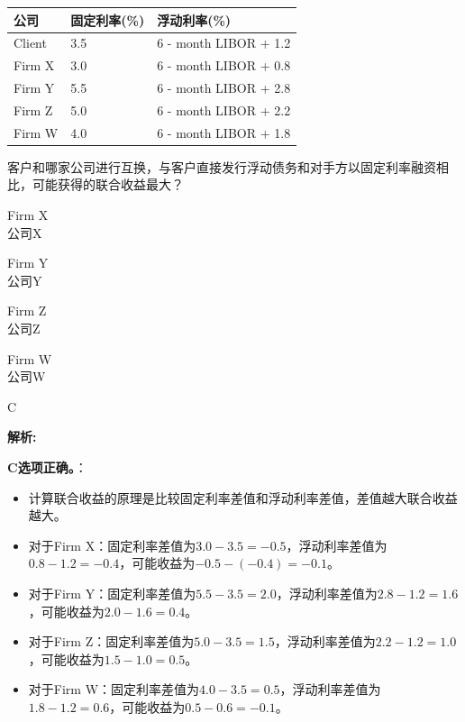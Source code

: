 \documentclass{article}
\newcounter{question} %
\newenvironment{explanation}
{\textbf{解析:}\par}
{\par}
\begin{document}
\begin{question}
\begin{center}
    \begin{tabular}{|l|l|l|}
    \hline
    公司 & 固定利率(\%) & 浮动利率(\%) \\
    \hline
    Client & 3.5 & 6 - month LIBOR + 1.2 \\
    \hline
    Firm X & 3.0 & 6 - month LIBOR + 0.8 \\
    \hline
    Firm Y & 5.5 & 6 - month LIBOR + 2.8 \\
    \hline
    Firm Z & 5.0 & 6 - month LIBOR + 2.2 \\
    \hline
    Firm W & 4.0 & 6 - month LIBOR + 1.8 \\
    \hline
    \end{tabular}
    \end{center}
    客户和哪家公司进行互换，与客户直接发行浮动债务和对手方以固定利率融资相比，可能获得的联合收益最大？
    \end{question}
    
    \begin{choices}
        \item Firm X\\公司X
        \item Firm Y\\公司Y
        \item Firm Z\\公司Z
        \item Firm W\\公司W
    \end{choices}
    
    \begin{correctanswer}
    C
    \end{correctanswer}
    
    \begin{explanation}
    \textbf{C选项正确。}：
    \begin{itemize}
    \item 计算联合收益的原理是比较固定利率差值和浮动利率差值，差值越大联合收益越大。
    \item 对于Firm X：固定利率差值为\(3.0 - 3.5 = - 0.5\)，浮动利率差值为\(0.8 - 1.2 = - 0.4\)，可能收益为\(- 0.5 - (- 0.4) = - 0.1\)。
    \item 对于Firm Y：固定利率差值为\(5.5 - 3.5 = 2.0\)，浮动利率差值为\(2.8 - 1.2 = 1.6\)，可能收益为\(2.0 - 1.6 = 0.4\)。 
    \item 对于Firm Z：固定利率差值为\(5.0 - 3.5 = 1.5\)，浮动利率差值为\(2.2 - 1.2 = 1.0\)，可能收益为\(1.5 - 1.0 = 0.5\)。 
    \item 对于Firm W：固定利率差值为\(4.0 - 3.5 = 0.5\)，浮动利率差值为\(1.8 - 1.2 = 0.6\)，可能收益为\(0.5 - 0.6=- 0.1\)。 
    \end{itemize}
    \end{explanation}
    
\end{document}
